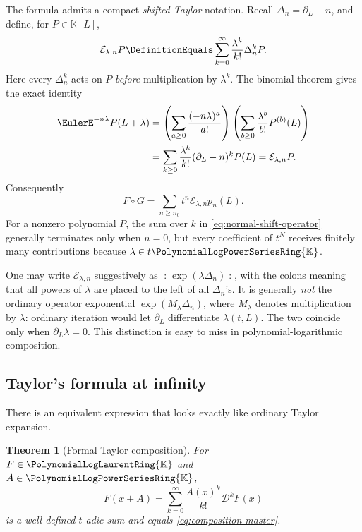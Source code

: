 \documentclass[11pt]{article}
\theoremstyle{pltheorem}
\newtheorem{theorem}{Theorem}[section]
\newcommand{\K}{\mathbb K}
\newcommand{\PL}{\PolynomialLogPowerSeriesRing{\K}}
\newcommand{\PLL}{\PolynomialLogLaurentRing{\K}}
\newcommand{\D}{\mathcal D}
\newcommand{\compose}{\mathbin{\circ}}
\begin{document}
The formula admits a compact \emph{shifted-Taylor} notation.  Recall
\(\Delta_n=\partial_L-n\), and define, for \(P\in\K[L]\),
\begin{equation}\label{eq:normal-shift-operator}
 \mathcal E_{\lambda,n}P
 \DefinitionEquals\sum_{k=0}^{\infty}\frac{\lambda^k}{k!}\Delta_n^kP.
\end{equation}
Here every \(\Delta_n^k\) acts on \(P\) \emph{before} multiplication by
\(\lambda^k\).  The binomial theorem gives the exact identity
\begin{align}
 \EulerE^{-n\lambda}P(L+\lambda)
 &=\left(\sum_{a\ge0}\frac{(-n\lambda)^a}{a!}\right)
   \left(\sum_{b\ge0}\frac{\lambda^b}{b!}P^{(b)}(L)\right)\notag\\
 &=\sum_{k\ge0}\frac{\lambda^k}{k!}(\partial_L-n)^kP(L)
 =\mathcal E_{\lambda,n}P.\label{eq:shifted-Taylor-identity}
\end{align}
Consequently
\begin{equation}\label{eq:composition-operator-form}
 F\compose G
 =\sum_{n\ge n_0}t^n\mathcal E_{\lambda,n}p_n(L).
\end{equation}
For a nonzero polynomial \(P\), the sum over \(k\) in
\cref{eq:normal-shift-operator} generally terminates only when \(n=0\),
but every coefficient of \(t^N\) receives finitely many
contributions because \(\lambda\in t\PL\).

\begin{warningbox}
One may write \(\mathcal E_{\lambda,n}\) suggestively as
\(\mathopen{:}\!\exp(\lambda\Delta_n)\!\mathclose{:}\), with the colons
meaning that all powers of \(\lambda\) are placed to the left of all
\(\Delta_n\)'s.  It is generally \emph{not} the ordinary operator
exponential \(\exp(M_\lambda\Delta_n)\), where \(M_\lambda\) denotes
multiplication by \(\lambda\): ordinary iteration would let
\(\partial_L\) differentiate \(\lambda(t,L)\).  The two coincide only
when \(\partial_L\lambda=0\).  This distinction is easy to miss in
polynomial-logarithmic composition.
\end{warningbox}

\subsection{Taylor's formula at infinity}

There is an equivalent expression that looks exactly like ordinary Taylor expansion.

\begin{theorem}[Formal Taylor composition]\label{thm:formal-Taylor}
For \(F\in\PLL\) and \(A\in\PL\),
\begin{equation}\label{eq:formal-Taylor}
 F(x+A)=\sum_{k=0}^{\infty}\frac{A(x)^k}{k!}\D^kF(x)
\end{equation}
is a well-defined \(t\)-adic sum and equals \cref{eq:composition-master}.
\end{theorem}
\end{document}
